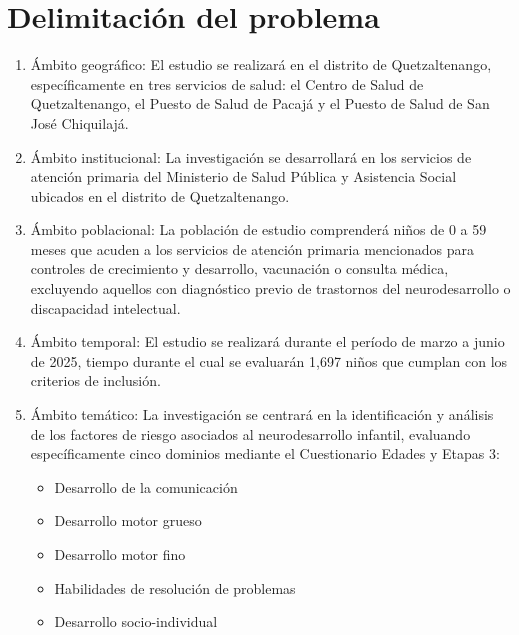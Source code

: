 \documentclass[11pt,letterpaper]{report}
\begin{document}
\section{Delimitación del problema}
\begin{enumerate}
	\item Ámbito geográfico: El estudio se realizará en el distrito de
		Quetzaltenango, específicamente en tres servicios de salud: el Centro
		de Salud de Quetzaltenango, el Puesto de Salud de Pacajá y el Puesto de
		Salud de San José Chiquilajá.
	\item Ámbito institucional: La investigación se desarrollará en los
		servicios de atención primaria del Ministerio de Salud Pública y
		Asistencia Social ubicados en el distrito de Quetzaltenango.
	\item Ámbito poblacional: La población de estudio comprenderá niños de 0 a
		59 meses que acuden a los servicios de atención primaria mencionados
		para controles de crecimiento y desarrollo, vacunación o consulta
		médica, excluyendo aquellos con diagnóstico previo de trastornos del
		neurodesarrollo o discapacidad intelectual.
	\item Ámbito temporal: El estudio se realizará durante el período de marzo
		a junio de 2025, tiempo durante el cual se evaluarán 1,697 niños que
		cumplan con los criterios de inclusión.
	\item Ámbito temático: La investigación se centrará en la identificación y
		análisis de los factores de riesgo asociados al neurodesarrollo
		infantil, evaluando específicamente cinco dominios mediante el
		Cuestionario Edades y Etapas 3:
		\begin{itemize}
			\item Desarrollo de la comunicación
			\item Desarrollo motor grueso
			\item Desarrollo motor fino
			\item Habilidades de resolución de problemas
			\item Desarrollo socio-individual
		\end{itemize}
\end{enumerate}
\end{document}
